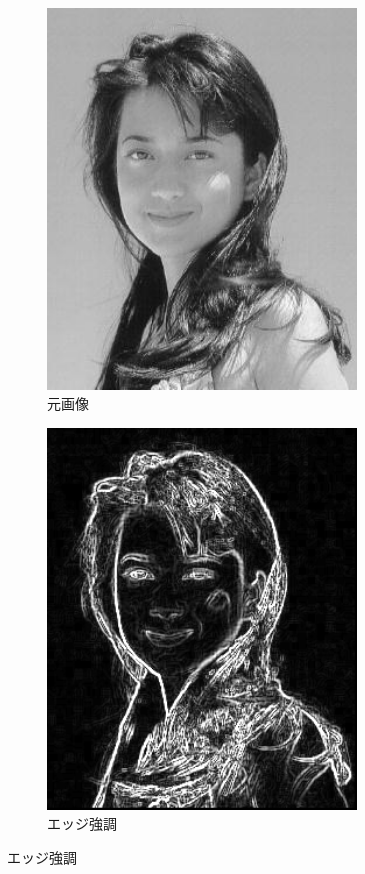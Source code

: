 \documentclass[a4paper,12pt]{jsarticle}
\begin{document}
\begin{figure}[!htbp]
\centering
\begin{subfigure}[b]{0.45\textwidth}
    \centering
    \includegraphics[width=0.9\textwidth]{./sampleimages/sample11.png}
    \caption{元画像}
\end{subfigure}
\hfill
\begin{subfigure}[b]{0.45\textwidth}
    \centering
    \includegraphics[width=0.9\textwidth]{./images/edge_enhanced_sample11_edge.png}
    \caption{エッジ強調}
\end{subfigure}


\end{figure}
\end{document}
